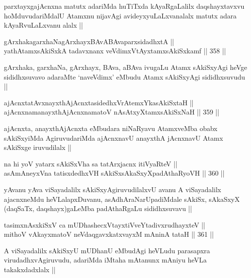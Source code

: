 \begin{artha}
parxtayxgajAcnxna matutx adariMda huTiTxda kAyaRgaLalilx
daqshayxtavxvu hoMduvudariMdalU Atamxnu nijavAgi avideyxyuLaLxvanalalx
matutx adara kAyaRvuLaLxvanu alalx ||
\end{artha}

\begin{shl}
gArxhakagarxhaNagArxhayxBAvABAvaparxsidadhxtA || \\
yathA\s \s tamxsAkiSxkA tadavxnanx veVdimxVtAyxtamxsAkiSxkamf ||  358 ||  
\end{shl}

\begin{artha}
gArxhaka, garxhaNa, gArxhayx, BAva, aBAva ivugaLu Atamx sAkiSxyAgi
heVge sididhxsuvavo adaraMte `naveVdimx' eMbudu Atamx sAkiSxyAgi
sididhxsuvudu ||
\end{artha}

\begin{shl}
ajAcnxtatAvxnayxthAjAcnxtasidedhxVrAtemxYkasAkiSxtaH || \\
ajAcnxnamanayxthAjAcnxnamatoV nAsAtxyXtamxsAkiSxNaH ||  359 ||  
\end{shl}

\begin{artha}
ajAcnxta, anayxthAjAcnxta eMbudara niNaRyavu AtamxveMba obabx
sAkiSxyiMda AgiruvudariMda ajAcnxnavU anayxthA jAcnxnavU Atamx
sAkiSxge iruvudilalx ||
\end{artha}

\begin{shl}
na hi yoV yatarx sAkiSxVha sa tatArxjacnx itiVyaRteV || \\
asAmAneyxVna tatisxdedhxVH sAkiSxsAkaSxyXpadAthaRyoVH ||  360 ||  
\end{shl}

\begin{artha}
yAvanu yAva viSayadalilx sAkiSxyAgiruvudilalxvU avanu A viSayadalilx
ajacnxneMdu heVLalapxDuvanu, asAdhAraNarUpadiMdale sAkiSx, sAkaSxyX
(daqSaTx, daqshayx)gaLeMba padAthaRgaLu sididhxsuvavu ||
\end{artha}


\begin{shl}
tasimxnAsxkiSxV ca mUDhashecxVtayxtiVveYtadivxrudhayxteV || \\
mithoV vAkayxmatoV neVdaqgavxkatxvayxM mAninA tataH ||  361 ||  
\end{shl}

\begin{artha}
A viSayadalilx sAkiSxyU mUDhanU eMbudAgi heVLudu parasapxra
virudadhxvAgiruvudu, adariMda iMtaha mAtanunx mAniyu heVLa
takakxdadxlalx ||
\end{artha}

